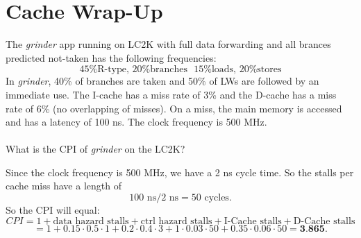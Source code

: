
\section{Cache Wrap-Up}

\begin{problem}
  The \emph{grinder} app running on LC2K with full data forwarding and all brances predicted not-taken has the following frequencies:
  \[
    \text{45\% R-type, 20\% branches} \: \: \: \text{15\% loads, 20\% stores}  
  \]
  In \emph{grinder}, 40\% of branches are taken and 50\% of LWs are followed by an immediate use. The I-cache has a miss rate of 3\% and the D-cache has a miss rate of 6\% (no overlapping of misses). On a miss, the main memory is accessed and has a latency of 100 ns. The clock frequency is 500 MHz. \\
  \\
  What is the CPI of \emph{grinder} on the LC2K?
\end{problem}
\begin{answer}
  Since the clock frequency is 500 MHz, we have a 2 ns cycle time. So the stalls per cache miss have a length of
  \[
    100 \text{ ns} / 2 \text{ ns} = 50 \text{ cycles}.
  \]
  So the CPI will equal:
  \[
    CPI = 1 + \text{data hazard stalls} + \text{ctrl hazard stalls} + \text{I-Cache stalls} + \text{D-Cache stalls}
  \]
  \[
    = 1 + 0.15 \cdot 0.5 \cdot 1 + 0.2 \cdot 0.4 \cdot 3 + 1 \cdot 0.03 \cdot 50 + 0.35 \cdot 0.06 \cdot 50 = \textbf{3.865}.
  \]
\end{answer}

